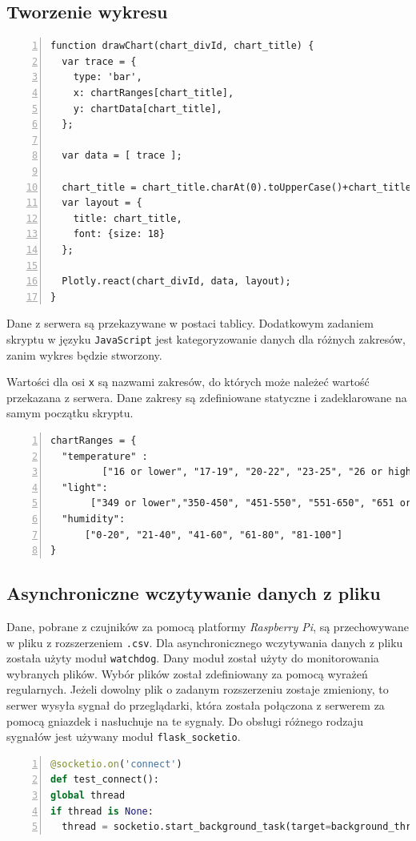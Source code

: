 \documentclass[a4paper]{article}
\begin{document}
    \subsection{Tworzenie wykresu}
    \begin{lstlisting}[frame=single, numbers=left, basicstyle=\ttfamily\small,
    caption={Funkcja do tworzenia histogramu za pomocą biblioteki \textsl{Plotly.js}}]
function drawChart(chart_divId, chart_title) {
  var trace = {
    type: 'bar',
    x: chartRanges[chart_title],
    y: chartData[chart_title],
  };

  var data = [ trace ];

  chart_title = chart_title.charAt(0).toUpperCase()+chart_title.slice(1);
  var layout = {
    title: chart_title,
    font: {size: 18}
  };

  Plotly.react(chart_divId, data, layout);
}
    \end{lstlisting}

    Dane z serwera są przekazywane w postaci tablicy. 
    Dodatkowym zadaniem skryptu w języku \texttt{JavaScript} jest kategoryzowanie danych
    dla różnych zakresów, zanim wykres będzie stworzony.

    \newpage
    Wartości dla osi \texttt{x} są nazwami zakresów, 
    do których może należeć wartość przekazana z serwera. 
    Dane zakresy są zdefiniowane statyczne i zadeklarowane na samym początku skryptu.
    \begin{lstlisting}[frame=single, numbers=left, basicstyle=\ttfamily\small,
caption={Zdefiniowany zakresy w skrypcie \texttt{JavaScript}}]
chartRanges = {
  "temperature" :
	     ["16 or lower", "17-19", "20-22", "23-25", "26 or higher"],
  "light": 
       ["349 or lower","350-450", "451-550", "551-650", "651 or higher"],
  "humidity":
	  ["0-20", "21-40", "41-60", "61-80", "81-100"]
}
    \end{lstlisting}

\subsection{Asynchroniczne wczytywanie danych z pliku}
    Dane, pobrane z czujników za pomocą platformy \textit{Raspberry Pi}, są przechowywane w pliku z rozszerzeniem \texttt{.csv}.
    Dla asynchronicznego wczytywania danych z pliku została użyty moduł \texttt{watchdog}.
    Dany moduł został użyty do monitorowania wybranych plików. 
    Wybór plików został zdefiniowany za pomocą wyrażeń regularnych. 
    Jeżeli dowolny plik o zadanym rozszerzeniu zostaje zmieniony, to serwer wysyła sygnał do przeglądarki,
    która została połączona z serwerem za pomocą gniazdek i nasłuchuje na te sygnały.
    Do obsługi różnego rodzaju sygnałów jest używany moduł \texttt{flask\_socketio}.
    \begin{lstlisting}[frame=single, numbers=left, basicstyle=\ttfamily\small, language=python,
    caption={Połączenie gniazdka na serwerze z gniazdkiem w przeglądrce}]
@socketio.on('connect')
def test_connect():
global thread
if thread is None:
  thread = socketio.start_background_task(target=background_thread)
    \end{lstlisting}
\end{document}
